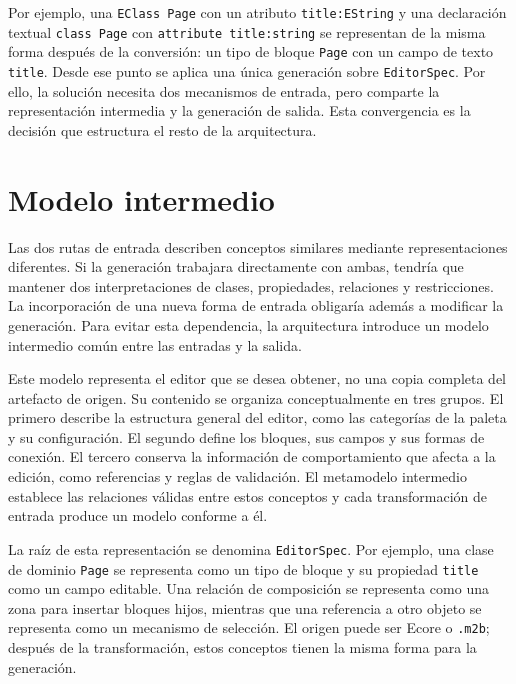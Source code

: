 Por ejemplo, una \texttt{EClass Page} con un atributo
\texttt{title:EString} y una declaración textual \texttt{class Page} con
\texttt{attribute title:string} se representan de la misma forma después de la
conversión: un tipo de bloque \texttt{Page} con un campo de texto
\texttt{title}. Desde ese punto se aplica una única generación sobre
\texttt{EditorSpec}. Por ello, la solución necesita dos mecanismos de entrada,
pero comparte la representación intermedia y la generación de salida. Esta
convergencia es la decisión que estructura el resto de la arquitectura.

\section{Modelo intermedio}
\label{sec:modelo-intermedio}

Las dos rutas de entrada describen conceptos similares mediante representaciones
diferentes. Si la generación trabajara directamente con ambas, tendría que
mantener dos interpretaciones de clases, propiedades, relaciones y restricciones.
La incorporación de una nueva forma de entrada obligaría además a modificar la
generación. Para evitar esta dependencia, la arquitectura introduce un modelo
intermedio común entre las entradas y la salida.

Este modelo representa el editor que se desea obtener, no una copia completa del
artefacto de origen. Su contenido se organiza conceptualmente en tres grupos. El
primero describe la estructura general del editor, como las categorías de la
paleta y su configuración. El segundo define los bloques, sus campos y sus
formas de conexión. El tercero conserva la información de comportamiento que
afecta a la edición, como referencias y reglas de validación. El metamodelo
intermedio establece las relaciones válidas entre estos conceptos y cada
transformación de entrada produce un modelo conforme a él.

La raíz de esta representación se denomina \texttt{EditorSpec}. Por ejemplo,
una clase de dominio \texttt{Page} se representa como un tipo de bloque y su
propiedad \texttt{title} como un campo editable. Una relación de composición se
representa como una zona para insertar bloques hijos, mientras que una referencia
a otro objeto se representa como un mecanismo de selección. El origen puede ser
Ecore o \texttt{.m2b}; después de la transformación, estos conceptos tienen la
misma forma para la generación.



